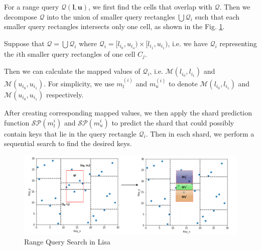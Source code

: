 For a range query $\mathcal{Q}(\boldsymbol{l},\boldsymbol{u})$, we first find the cells that overlap with $\mathcal{Q}$. Then we decompose $\mathcal{Q}$ into the union of smaller query rectangles $\bigcup \mathcal{Q}_i$ such that each smaller query rectangles intersects only one cell, as shown in the Fig. \ref{fig:Range_Query_Lisa}.

 Suppose that $\mathcal{Q}=\bigcup \mathcal{Q}_i$ where $\mathcal{Q}_i=[l_{i_0}, u_{i_o})\times [l_{i_1}, u_{i_1})$, i.e. we have $\mathcal{Q}_i$ representing the $i$th smaller query rectangles of one cell $C_j$.
 
 Then we can calculate the mapped values of $\mathcal{Q}_i$, i.e. $\mathcal{M}(l_{i_0}, l_{i_1})$ and $\mathcal{M}(u_{i_0}, u_{i_1})$. For simplicity, we use $m_l^{(i)}$ and $m_u^{(i)}$ to denote $\mathcal{M}(l_{i_0}, l_{i_1})$ and $\mathcal{M}(u_{i_0}, u_{i_1})$ respectively.
 
After creating corresponding mapped values, we then apply the shard prediction function $\mathcal{SP}(m_{l}^{i})$ and $\mathcal{SP}(m_{u}^{i})$ to predict the shard that could possibly contain keys that lie in the query rectangle $\mathcal{Q}_i$. Then in each shard, we perform a sequential search to find the desired keys. 

\begin{figure}[!htb]
    \centering
    \includegraphics[width=\textwidth]{graphs/range_query_lisa.png}
    \caption{Range Query Search in Lisa} 
    \label{fig:Range_Query_Lisa}
\end{figure}

